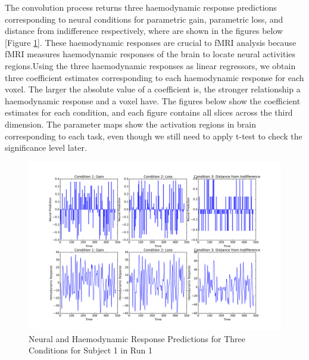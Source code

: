 \par \indent The convolution process returns three haemodynamic response predictions corresponding to neural conditions for parametric gain, parametric loss, and distance from indifference respectively, where are shown in the figures below [Figure \ref{fig:convolution}]. These haemodynamic responses are crucial to fMRI analysis because fMRI measures haemodynamic responses of the brain to locate neural activities regions.Using the three haemodynamic responses as linear regressors, we obtain three coefficient estimates corresponding to each haemodynamic response for each voxel. The larger the absolute value of a coefficient is, the stronger relationship a haemodynamic response and a voxel have. The figures below show the coefficient estimates for each condition, and each figure contains all slices across the third dimension. The parameter maps show the activation regions in brain corresponding to each task, even though we still need to apply t-test to check the significance level later. 

\begin{figure}[h!]
\centering
\includegraphics[width=120mm]{images/convolution3cond.png}
\caption{Neural and Haemodynamic Response Predictions for Three Conditions for Subject 1 in Run 1}
\label{fig:convolution}
\end{figure}
